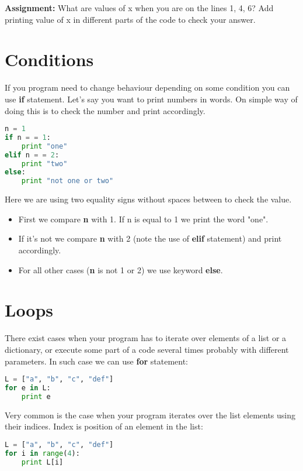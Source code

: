 \bigskip
\begin{tcolorbox}
\textbf{Assignment:}
What are values of x when you are on the lines 1, 4, 6?
Add printing value of x in different parts of the code
to check your answer.
\end{tcolorbox}


\section{Conditions}
If you program need to change behaviour depending on some condition
you can use \textbf{if} statement.
Let's say you want to print numbers in words. On simple way of doing
this is to check the number and print accordingly.

\begin{lstlisting}[style=codelst2,language=Python,caption={Checking conditions}]
n = 1
if n = = 1:
    print "one"
elif n = = 2:
    print "two"
else:
    print "not one or two"
\end{lstlisting}
Here we are using two equality signs without spaces between 
to check the value.
\begin{itemize}
\item First we compare \textbf{n} with 1.
If n is equal to 1 we print the word "one".
\item If it's not we compare \textbf{n} with 2 (note the use of \textbf{elif} statement)
and print accordingly.
\item For all other cases (\textbf{n} is not 1 or 2) we use keyword \textbf{else}.
\end{itemize}


\section{Loops}
There exist cases when your program has to iterate over elements
of a list or a dictionary, or execute some part of a code several times
probably with different parameters. In such case we can use \textbf{for}
statement:

\begin{lstlisting}[style=codelst2,language=Python,caption="Loop"]
L = ["a", "b", "c", "def"]
for e in L:
    print e
\end{lstlisting}

Very common is the case when your program iterates over the
list elements using their indices. Index is position of an element
in the list:

\begin{lstlisting}[style=codelst2,language=Python,caption={Printing list elements by index - 1}]
L = ["a", "b", "c", "def"]
for i in range(4):
    print L[i]
\end{lstlisting}

